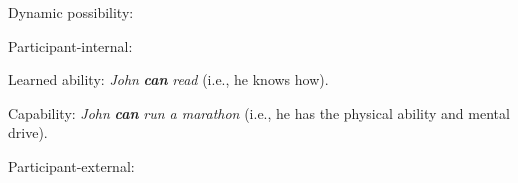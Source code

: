 \begin{listWWNumiileveli}
\item 
\begin{stylelsLanginfo}
\label{bkm:Ref52740274}Dynamic possibility:
\end{stylelsLanginfo}

\begin{listWWNumiilevelii}
\item 
\begin{stylelsLanginfo}
Participant-internal:
\end{stylelsLanginfo}
\end{listWWNumiilevelii}
\end{listWWNumiileveli}

\setcounter{listWWNumiiileveli}{0}
\begin{listWWNumiiileveli}
\item 

\setcounter{listWWNumiiilevelii}{0}
\begin{listWWNumiiilevelii}
\item 

\setcounter{listWWNumiiileveliii}{0}
\begin{listWWNumiiileveliii}
\item 

\setcounter{listWWNumiiileveliv}{0}
\begin{listWWNumiiileveliv}
\item 
\begin{styleListParagraph}
Learned ability: \textit{John }\textbf{\textit{can}}\textit{ read} (i.e., he knows how).
\end{styleListParagraph}
\begin{stylelsLanginfo}
Capability: \textit{John }\textbf{\textit{can}}\textit{ run a marathon} (i.e., he has the physical ability and mental drive).
\end{stylelsLanginfo}
\end{listWWNumiiileveliv}
\end{listWWNumiiileveliii}
\end{listWWNumiiilevelii}
\end{listWWNumiiileveli}

\setcounter{listWWNumiileveli}{0}
\begin{listWWNumiileveli}
\item 

\setcounter{listWWNumiilevelii}{0}
\begin{listWWNumiilevelii}
\item 
\begin{stylelsLanginfo}
Participant-external:
\end{stylelsLanginfo}
\end{listWWNumiilevelii}
\end{listWWNumiileveli}

